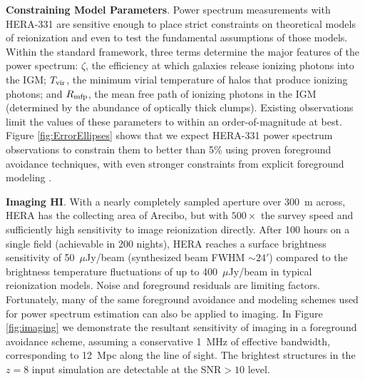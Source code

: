 \documentclass[preprint]{aastex}
\newcommand{\Mycitep}[1]{{\bf \citep{#1}}}
\newcommand{\compress}{\vspace{-0.25in}}
\begin{document}

{\bf Constraining Model Parameters}. Power spectrum measurements with HERA-331 are sensitive enough to place strict constraints on theoretical models of
reionization and even to test the fundamental assumptions of those models.  Within the standard framework,
three terms determine the major features of the power spectrum: $\zeta$, the efficiency at which galaxies
release ionizing photons  into the IGM; $T_{\rm vir}$, the minimum virial temperature of halos that produce
ionizing photons; and $R_{\rm mfp}$, the mean free path of ionizing
photons in the IGM (determined by the abundance of optically thick clumps).  Existing
observations limit the values of these parameters to within an order-of-magnitude at best.
Figure \ref{fig:ErrorEllipses} shows that we expect
HERA-331 power spectrum observations to constrain them to better
than 5\% using proven foreground avoidance techniques, with even stronger constraints from
explicit foreground modeling \Mycitep{pober_et_al2014}.


{\bf Imaging HI}. With a nearly completely sampled aperture over 300~m across, HERA has the collecting area of Arecibo, but
with $500\times$ the survey speed and sufficiently high sensitivity to image reionization directly.  After 100 hours on a
single field (achievable in 200 nights), HERA reaches a surface brightness sensitivity
of 50~$\mu$Jy/beam (synthesized beam FWHM $\sim 24'$) compared to the brightness temperature fluctuations of up to 400~$\mu$Jy/beam in typical reionization models.
Noise and foreground residuals are limiting factors.  Fortunately, many of the same foreground avoidance and modeling schemes used for power spectrum estimation can also be applied to imaging.  In Figure \ref{fig:imaging} we demonstrate the
resultant sensitivity of imaging in a foreground avoidance scheme, assuming a conservative 1~MHz of effective bandwidth, corresponding to 12~Mpc along the line of
sight.  The brightest structures in the $z=8$ input simulation are detectable at the SNR$>10$ level.
\end{document}
